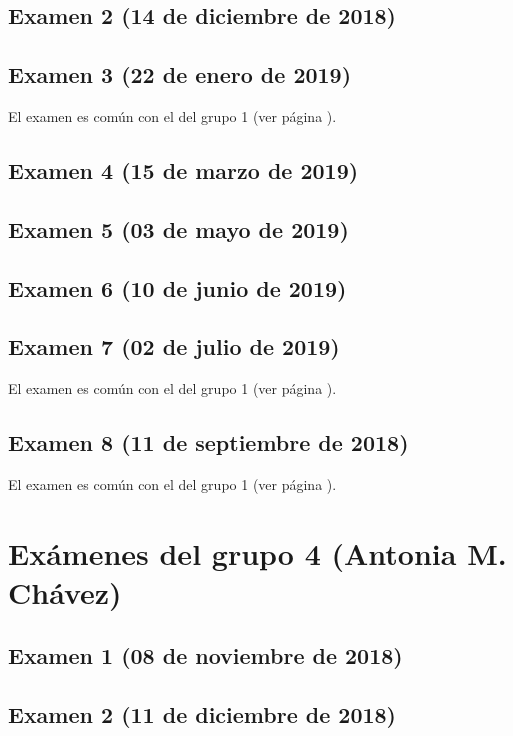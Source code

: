 \documentclass[a4paper,12pt,twoside]{book}
\begin{document}
\subsection{Examen 2 (14 de diciembre de 2018)}
\subsection{Examen 3 (22 de enero de 2019)}
El examen es común con el del grupo 1 (ver página \pageref{examen_18_19_4_3}).
\subsection{Examen 4 (15 de marzo de 2019)}
\subsection{Examen 5 (03 de mayo de 2019)}
\subsection{Examen 6 (10 de junio de 2019)}
 \label{examen_18_19_3_6}
\subsection{Examen 7 (02 de julio de 2019)}
El examen es común con el del grupo 1 (ver página \pageref{examen_18_19_1_7}).
\subsection{Examen 8 (11 de septiembre de 2018)}
El examen es común con el del grupo 1 (ver página \pageref{examen_18_19_1_8}).

\section{Exámenes del grupo 4 (Antonia M. Chávez)}
\subsection{Examen 1 (08 de noviembre de 2018)}
\subsection{Examen 2 (11 de diciembre de 2018)}
\end{document}
